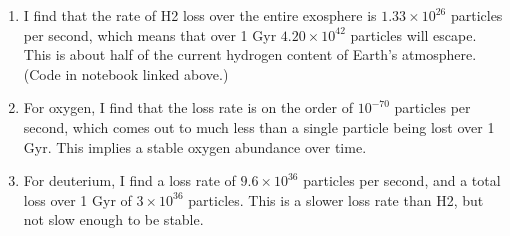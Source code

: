 \documentclass[11pt]{article}
\begin{document}
\begin{enumerate}
\begin{enumerate}
	\item I find that the rate of H2 loss over the entire exosphere is $1.33\times10^{26}$ particles per second, which means that over 1 Gyr $4.20\times10^{42}$ particles will escape. This is about half of the current hydrogen content of Earth's atmosphere. (Code in notebook linked above.)
	
	\item For oxygen, I find that the loss rate is on the order of $10^{-70}$ particles per second, which comes out to much less than a single particle being lost over 1 Gyr. This implies a stable oxygen abundance over time.
	
	\item For deuterium, I find a loss rate of $9.6 \times 10^{36}$ particles per second, and a total loss over 1 Gyr of $3 \times 10^{36}$ particles. This is a slower loss rate than H2, but not slow enough to be stable.
    
    \end{enumerate}

\end{enumerate}
\end{document}
